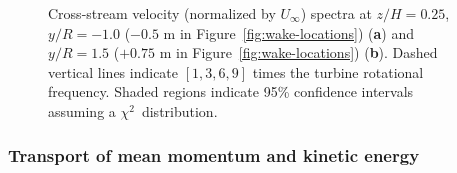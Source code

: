 \begin{figure}[ht]
\centering


\caption{Cross-stream velocity (normalized by $U_\infty$) spectra at
    $z/H=0.25$, $y/R=-1.0$ ($-0.5$ m in Figure~\ref{fig:wake-locations})
    (\textbf{a}) and $y/R=1.5$ ($+0.75$ m in Figure~\ref{fig:wake-locations})
    (\textbf{b}). Dashed vertical lines indicate $[1, 3, 6, 9]$ times the
    turbine rotational frequency. Shaded regions indicate 95\% confidence
    intervals assuming a $\chi^2$~distribution.}

\label{fig:wake-spectra}
\end{figure}


\subsubsection{Transport of mean momentum and kinetic energy}

